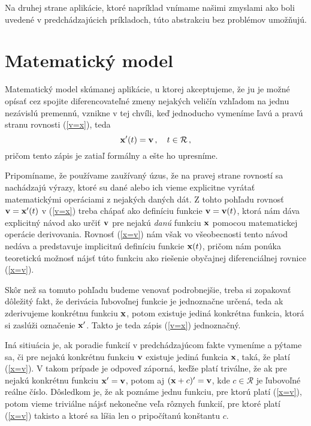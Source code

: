 Na druhej strane aplikácie, ktoré napríklad vnímame našimi zmyslami ako boli uvedené v predchádzajúcich príkladoch, túto abstrakciu bez problémov umožňujú. 

\section{Matematický model}

Matematický model skúmanej aplikácie, u ktorej akceptujeme, že ju je možné opísať cez spojite diferencovateľné zmeny nejakých veličín vzhľadom na jednu nezávislú premennú, vznikne v tej chvíli, keď jednoducho vymeníme ľavú a pravú stranu rovnosti (\ref{v=x}), teda 
\begin{equation}
\label{x=v}
{\bf x}'(t) = {\bf v} \,, \quad t \in \mathcal{R} \,,
\end{equation}
pričom tento zápis je zatiaľ formálny a ešte ho upresníme.

 Pripomíname, že používame zaužívaný úzus, že na pravej strane rovností sa nachádzajú výrazy, ktoré su dané alebo ich vieme explicitne vyrátať matematickými operáciami z nejakých daných dát.
Z tohto pohľadu rovnosť ${\bf v}={\bf x}'(t)$ v (\ref{v=x}) treba chápať ako definíciu funkcie ${\bf v}={\bf v}(t)$, ktorá nám dáva explicitný návod ako určiť $\bf v$ pre nejakú {\it danú} funkciu ${\bf x}$ pomocou matematickej operácie derivovania.
Rovnosť (\ref{x=v}) nám však vo všeobecnosti tento návod nedáva a predstavuje implicitnú definíciu funkcie ${\bf x}(t)$, pričom nám ponúka teoretickú možnosť nájsť túto funkciu ako riešenie obyčajnej diferenciálnej rovnice (\ref{x=v}).

Skôr než sa tomuto pohľadu budeme venovať podrobnejšie, treba si zopakovať dôležitý fakt, že derivácia ľubovoľnej funkcie je jednoznačne určená, teda ak zderivujeme konkrétnu funkciu $\bf x$, potom existuje jediná konkrétna funkcia, ktorá si zaslúži označenie $\bf x'$. Takto je teda zápis (\ref{v=x}) jednoznačný. 

Iná sitiuácia je, ak poradie funkcií v predchádzajúcom fakte vymeníme a pýtame sa, či pre nejakú konkrétnu funkciu $\bf v$ existuje jediná funkcia $\bf x$, taká, že platí (\ref{x=v}). V takom prípade je odpoveď záporná, keďže platí triválne, že ak pre nejakú konkrétnu funkciu ${\bf x}'={\bf v}$, potom aj $({\bf x}+c)'={\bf v}$, kde $c \in \mathcal{R}$  je ľubovoľné reálne číslo. Dôsledkom je, že ak poznáme jednu funkciu, pre ktorú platí (\ref{x=v}), potom vieme triviálne nájsť nekonečne veľa rôznych funkcií, pre ktoré platí (\ref{x=v}) takisto a ktoré sa líšia len o pripočítanú konštantu $c$.

